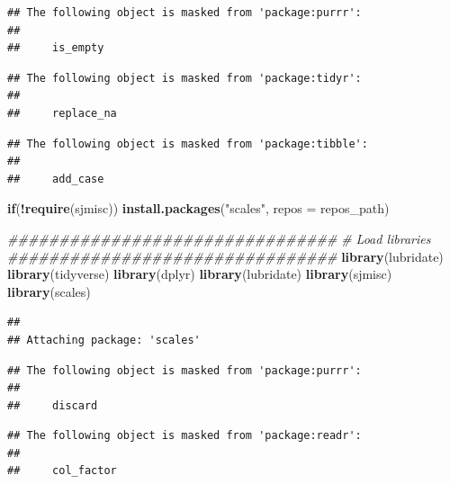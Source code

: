 \documentclass[]{article}
\newenvironment{Shaded}{\begin{snugshade}}{\end{snugshade}}
\newcommand{\CommentTok}[1]{\textcolor[rgb]{0.56,0.35,0.01}{\textit{#1}}}
\newcommand{\ControlFlowTok}[1]{\textcolor[rgb]{0.13,0.29,0.53}{\textbf{#1}}}
\newcommand{\DataTypeTok}[1]{\textcolor[rgb]{0.13,0.29,0.53}{#1}}
\newcommand{\KeywordTok}[1]{\textcolor[rgb]{0.13,0.29,0.53}{\textbf{#1}}}
\newcommand{\NormalTok}[1]{#1}
\newcommand{\OperatorTok}[1]{\textcolor[rgb]{0.81,0.36,0.00}{\textbf{#1}}}
\newcommand{\StringTok}[1]{\textcolor[rgb]{0.31,0.60,0.02}{#1}}
\begin{document}
\begin{verbatim}
## The following object is masked from 'package:purrr':
## 
##     is_empty
\end{verbatim}

\begin{verbatim}
## The following object is masked from 'package:tidyr':
## 
##     replace_na
\end{verbatim}

\begin{verbatim}
## The following object is masked from 'package:tibble':
## 
##     add_case
\end{verbatim}

\begin{Shaded}
\begin{Highlighting}[]
\ControlFlowTok{if}\NormalTok{(}\OperatorTok{!}\KeywordTok{require}\NormalTok{(sjmisc)) }\KeywordTok{install.packages}\NormalTok{(}\StringTok{"scales"}\NormalTok{, }\DataTypeTok{repos =}\NormalTok{ repos_path)}

\CommentTok{################################}
\CommentTok{# Load libraries}
\CommentTok{################################}
\KeywordTok{library}\NormalTok{(lubridate)}
\KeywordTok{library}\NormalTok{(tidyverse)}
\KeywordTok{library}\NormalTok{(dplyr)}
\KeywordTok{library}\NormalTok{(lubridate)}
\KeywordTok{library}\NormalTok{(sjmisc)}
\KeywordTok{library}\NormalTok{(scales)}
\end{Highlighting}
\end{Shaded}

\begin{verbatim}
## 
## Attaching package: 'scales'
\end{verbatim}

\begin{verbatim}
## The following object is masked from 'package:purrr':
## 
##     discard
\end{verbatim}

\begin{verbatim}
## The following object is masked from 'package:readr':
## 
##     col_factor
\end{verbatim}
\end{document}
